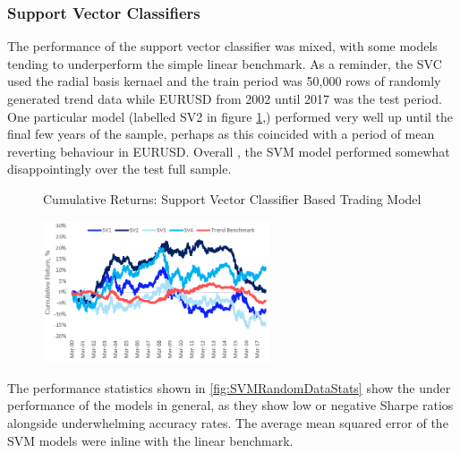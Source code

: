 \documentclass[11pt]{article}
\begin{document}
\subsubsection{Support Vector Classifiers}
The performance of the support vector classifier was mixed, with some models tending to underperform the simple linear benchmark. As a reminder, the SVC used the radial basis kernael and the train period was 50,000 rows of randomly generated trend data while EURUSD from 2002 until 2017 was the test period. One particular model (labelled SV2 in figure \ref{fig:SVMRandomDataResults},) performed very well up until the final few years of the sample, perhaps as this coincided with a period of mean reverting behaviour in EURUSD. Overall , the SVM model performed somewhat disappointingly over the test full sample.
\begin{figure}[h]
    \centering
	\caption{Cumulative Returns: Support Vector Classifier Based Trading Model}    
	\includegraphics[width=0.6\textwidth]{SVMRandomDataResults}
    \label{fig:SVMRandomDataResults}
     \caption*{}
\end{figure}

The performance statistics shown in \ref{fig:SVMRandomDataStats} show the under performance of the models in general, as they show low or negative Sharpe ratios alongside underwhelming accuracy rates. The average mean squared error of the SVM models were inline with the linear benchmark.
\end{document}
